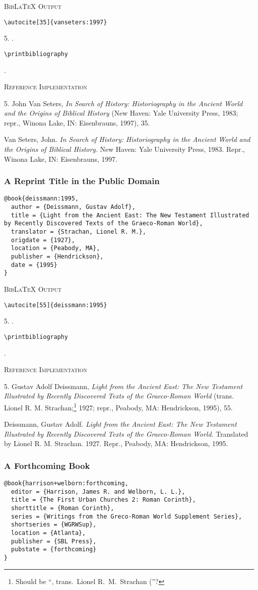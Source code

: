 \documentclass[a4paper]{article}
\newcommand\citetestns[3]{%
  {\textsc{BibLaTeX Output}\par
   \nobreak
   \texttt{\textbackslash autocite[#2]\{#3\}}\par
   \color{biblatex-colour}
   #1. \cite[#2]{#3}.\par
   \color{black}
   \texttt{\textbackslash printbibliography}\par
   \color{biblatex-colour}
   \sloppy\hangindent\bibindent\bibentrycite{#3}.\par}}
\newenvironment{refimp}{%
  \begin{minipage}{\linewidth}
    \setlength{\parskip}{1ex}
    \textsc{Reference Implementation}\par
    \nobreak
    \color{reference-colour}
}{\end{minipage}}
\begin{document}
\citetestns{5}{35}{vanseters:1997}

\begin{refimp}
  5. John Van Seters, \emph{In Search of History: Historiography in the
  Ancient World and the Origins of Biblical History} (New Haven: Yale
  University Press, 1983; repr., Winona Lake, IN: Eisenbrauns, 1997), 35.

  \hangindent\bibindent Van Seters, John. \emph{In Search of History:
  Historiography in the Ancient World and the Origins of Biblical History.}
  New Haven: Yale University Press, 1983. Repr., Winona Lake, IN: Eisenbrauns,
  1997.
\end{refimp}

\subsubsection{A Reprint Title in the Public Domain}

\begin{lstlisting}
@book{deissmann:1995,
  author = {Deissmann, Gustav Adolf},
  title = {Light from the Ancient East: The New Testament Illustrated by Recently Discovered Texts of the Graeco-Roman World},
  translator = {Strachan, Lionel R. M.},
  origdate = {1927},
  location = {Peabody, MA},
  publisher = {Hendrickson},
  date = {1995}
}
\end{lstlisting}  

\citetestns{5}{55}{deissmann:1995}

\begin{refimp}
  5. Gustav Adolf Deissmann, \emph{Light from the Ancient East: The New Testament
  Illustrated by Recently Discovered Texts of the Graeco-Roman World} (trans.
  Lionel R. M. Strachan;\footnote{Should be “, trans.\ Lionel R.\ M.\ Strachan
  (”?} 1927; repr., Peabody, MA: Hendrickson, 1995), 55.

  \hangindent\bibindent Deissmann, Gustav Adolf. \emph{Light from the Ancient
  East: The New Testament Illustrated by Recently Discovered Texts of the
  Graeco-Roman World.} Translated by Lionel R. M. Strachan. 1927. Repr., Peabody,
  MA: Hendrickson, 1995.
\end{refimp}

\subsubsection{A Forthcoming Book}

\begin{lstlisting}
@book{harrison+welborn:forthcoming,
  editor = {Harrison, James R. and Welborn, L. L.},
  title = {The First Urban Churches 2: Roman Corinth},
  shorttitle = {Roman Corinth},
  series = {Writings from the Greco-Roman World Supplement Series},
  shortseries = {WGRWSup},
  location = {Atlanta},
  publisher = {SBL Press},
  pubstate = {forthcoming}
}
\end{lstlisting}
\end{document}
